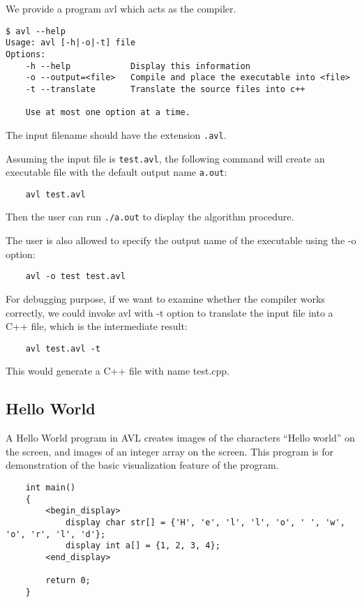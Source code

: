 We provide a program avl which acts as the compiler.

\begin{verbatim}
$ avl --help
Usage: avl [-h|-o|-t] file
Options:
    -h --help            Display this information
    -o --output=<file>   Compile and place the executable into <file>
    -t --translate       Translate the source files into c++

    Use at most one option at a time.
\end{verbatim}

The input filename should have the extension \verb".avl".

Assuming the input file is \verb"test.avl", the following command will create an executable file
with the default output name \verb"a.out":

\begin{verbatim}
    avl test.avl
\end{verbatim}

Then the user can run \verb"./a.out" to display the algorithm procedure.

The user is also allowed to specify the output name of the executable using the -o option:

\begin{verbatim}
    avl -o test test.avl
\end{verbatim}

For debugging purpose, if we want to examine whether the compiler works correctly, we could invoke
avl with -t option to translate the input file into a C++ file, which is the intermediate result:

\begin{verbatim}
    avl test.avl -t
\end{verbatim}

This would generate a C++ file with name test.cpp.

\subsection{Hello World}
A Hello World program in AVL creates images of the characters ``Hello world'' on the screen, and
images of an integer array on the screen. This program is for demonstration of the basic
visualization feature of the program.

\begin{verbatim}
    int main()
    {
        <begin_display>
            display char str[] = {'H', 'e', 'l', 'l', 'o', ' ', 'w', 'o', 'r', 'l', 'd'};
            display int a[] = {1, 2, 3, 4};
        <end_display>

        return 0;
    }
\end{verbatim}

